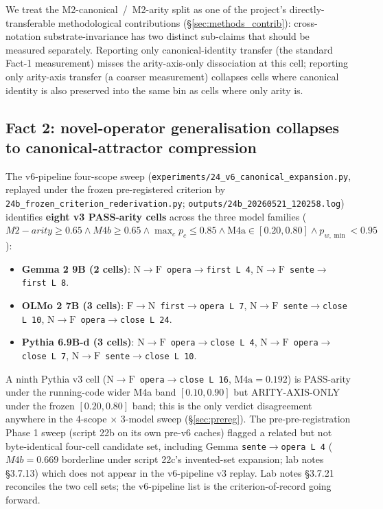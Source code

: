 \documentclass[11pt,letterpaper]{article}
\newcommand{\NtoF}{\ensuremath{\mathrm{N}\!\to\!\mathrm{F}}}
\newcommand{\FtoN}{\ensuremath{\mathrm{F}\!\to\!\mathrm{N}}}
\newcommand{\Mc}{M2-canonical}
\newcommand{\Ma}{M2-arity}
\newcommand{\Mbfb}{M4b}
\newcommand{\pwmin}{\ensuremath{p_{w,\min}}}
\begin{document}
We treat the \Mc{}~/~\Ma{} split as one of the project's
directly-transferable methodological contributions
(\S\ref{sec:methods_contrib}): cross-notation substrate-invariance has
two distinct sub-claims that should be measured separately. Reporting
only canonical-identity transfer (the standard Fact-1 measurement)
misses the arity-axis-only dissociation at this cell; reporting only
arity-axis transfer (a coarser measurement) collapses cells where
canonical identity is also preserved into the same bin as cells where
only arity is.

\subsection{Fact 2: novel-operator generalisation collapses to canonical-attractor compression}
\label{sec:fact2}

The v6-pipeline four-scope sweep
(\texttt{experiments/24\_v6\_canonical\_expansion.py}, replayed under
the frozen pre-registered criterion by
\texttt{24b\_frozen\_criterion\_rederivation.py};
\texttt{outputs/24b\_20260521\_120258.log}) identifies \textbf{eight
v3 PASS-arity cells} across the three model families
($\Ma \geq 0.65 \wedge \Mbfb \geq 0.65 \wedge \max_c p_c \leq 0.85
\wedge \text{M4a} \in [0.20, 0.80] \wedge \pwmin < 0.95$):

\begin{itemize}
  \item \textbf{Gemma 2 9B (2 cells)}:
  \texttt{\NtoF{} opera$\to$first L\,4},
  \texttt{\NtoF{} sente$\to$first L\,8}.
  \item \textbf{OLMo 2 7B (3 cells)}:
  \texttt{\FtoN{} first$\to$opera L\,7},
  \texttt{\NtoF{} sente$\to$close L\,10},
  \texttt{\NtoF{} opera$\to$close L\,24}.
  \item \textbf{Pythia 6.9B-d (3 cells)}:
  \texttt{\NtoF{} opera$\to$close L\,4},
  \texttt{\NtoF{} opera$\to$close L\,7},
  \texttt{\NtoF{} sente$\to$close L\,10}.
\end{itemize}

A ninth Pythia v3 cell (\texttt{\NtoF{} opera$\to$close L\,16},
$\text{M4a} = 0.192$) is PASS-arity under the running-code wider M4a
band $[0.10, 0.90]$ but ARITY-AXIS-ONLY under the frozen
$[0.20, 0.80]$ band; this is the only verdict disagreement anywhere
in the 4-scope $\times$ 3-model sweep (\S\ref{sec:prereg}). The
pre-pre-registration Phase 1 sweep (script 22b on its own pre-v6
caches) flagged a related but not byte-identical four-cell candidate
set, including Gemma \texttt{sente$\to$opera L\,4}
($\Mbfb = 0.669$ borderline under script 22c's invented-set
expansion; lab notes \S3.7.13) which does not appear in the
v6-pipeline v3 replay. Lab notes \S3.7.21 reconciles the two cell
sets; the v6-pipeline list is the criterion-of-record going forward.
\end{document}
